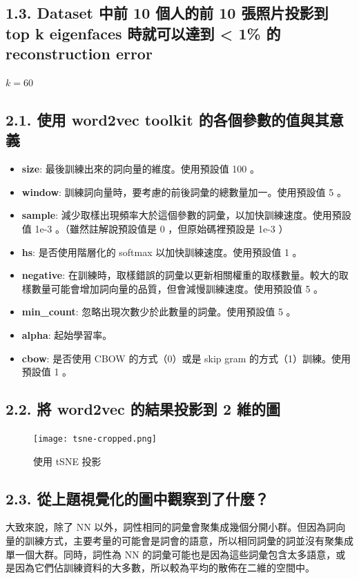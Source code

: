 \documentclass[fleqn,a4paper,12pt]{article}
\begin{document}
\subsection*{1.3. Dataset 中前 10 個人的前 10 張照片投影到 top k eigenfaces 時就可以達到 < 1\% 的 reconstruction error}

$k = 60$

\subsection*{2.1. 使用 word2vec toolkit 的各個參數的值與其意義}

\begin{itemize}
\item \textbf{size}: 最後訓練出來的詞向量的維度。使用預設值 100 。
\item \textbf{window}: 訓練詞向量時，要考慮的前後詞彙的總數量加一。使用預設值 5 。
\item \textbf{sample}: 減少取樣出現頻率大於這個參數的詞彙，以加快訓練速度。使用預設值 1e-3 。（雖然註解說預設值是 0 ，但原始碼裡預設是 1e-3 ）
\item \textbf{hs}: 是否使用階層化的 softmax 以加快訓練速度。使用預設值 1 。
\item \textbf{negative}: 在訓練時，取樣錯誤的詞彙以更新相關權重的取樣數量。較大的取樣數量可能會增加詞向量的品質，但會減慢訓練速度。使用預設值 5 。
\item \textbf{min\_count}: 忽略出現次數少於此數量的詞彙。使用預設值 5 。
\item \textbf{alpha}: 起始學習率。
\item \textbf{cbow}: 是否使用 CBOW 的方式（0）或是 skip gram 的方式（1）訓練。使用預設值 1 。
\end{itemize}

\subsection*{2.2. 將 word2vec 的結果投影到 2 維的圖}

\begin{figure}[H]
\centering
\texttt{[image: tsne-cropped.png]}
\caption{使用 tSNE 投影}
\label{fig:p2.2}
\end{figure}


\subsection*{2.3. 從上題視覺化的圖中觀察到了什麼？}

大致來說，除了 NN 以外，詞性相同的詞彙會聚集成幾個分開小群。但因為詞向量的訓練方式，主要考量的可能會是詞會的語意，所以相同詞彙的詞並沒有聚集成單一個大群。同時，詞性為 NN 的詞彙可能也是因為這些詞彙包含太多語意，或是因為它們佔訓練資料的大多數，所以較為平均的散佈在二維的空間中。
\end{document}
